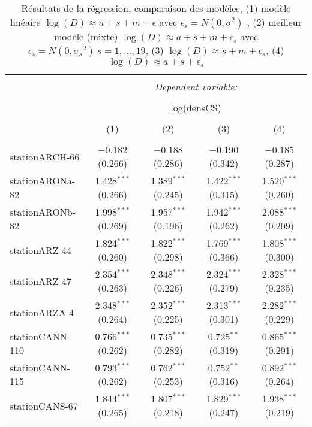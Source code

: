 
\begin{table}[!htbp] \centering 
  \caption{Résultats de la régression,
				comparaison des modèles, (1) modèle linéaire $\log (D){\approx}a+s+m+\epsilon$ avec $\epsilon_s=N(0,{\sigma}^2) $
				, (2) meilleur modèle (mixte) $\log (D){\approx}a+s+m+\epsilon_s$ avec $\epsilon_s=N(0,{\sigma_{s}}^2) ~s=1,\dots,19$,
				(3) $\log (D){\approx}s+m+\epsilon_s$,
				(4) $\log (D){\approx}a+s+\epsilon_s$} 
  \label{annex_regression_result} 
\begin{tabular}{@{\extracolsep{5pt}}lcccc} 
\\[-1.8ex]\hline 
\hline \\[-1.8ex] 
 & \multicolumn{4}{c}{\textit{Dependent variable:}} \\ 
\cline{2-5} 
\\[-1.8ex] & \multicolumn{4}{c}{log(densCS)} \\ 
\\[-1.8ex] & (1) & (2) & (3) & (4)\\ 
\hline \\[-1.8ex] 
 stationARCH-66 & $-$0.182 (0.266) & $-$0.188 (0.286) & $-$0.190 (0.342) & $-$0.185 (0.287) \\ 
  stationARONa-82 & 1.428$^{***}$ (0.266) & 1.389$^{***}$ (0.245) & 1.422$^{***}$ (0.315) & 1.520$^{***}$ (0.260) \\ 
  stationARONb-82 & 1.998$^{***}$ (0.269) & 1.957$^{***}$ (0.196) & 1.942$^{***}$ (0.262) & 2.088$^{***}$ (0.209) \\ 
  stationARZ-44 & 1.824$^{***}$ (0.260) & 1.822$^{***}$ (0.298) & 1.769$^{***}$ (0.366) & 1.808$^{***}$ (0.300) \\ 
  stationARZ-47 & 2.354$^{***}$ (0.263) & 2.348$^{***}$ (0.226) & 2.324$^{***}$ (0.279) & 2.328$^{***}$ (0.235) \\ 
  stationARZA-4 & 2.348$^{***}$ (0.264) & 2.352$^{***}$ (0.225) & 2.313$^{***}$ (0.301) & 2.282$^{***}$ (0.229) \\ 
  stationCANN-110 & 0.766$^{***}$ (0.262) & 0.735$^{***}$ (0.282) & 0.725$^{**}$ (0.319) & 0.865$^{***}$ (0.291) \\ 
  stationCANN-115 & 0.793$^{***}$ (0.262) & 0.762$^{***}$ (0.253) & 0.752$^{**}$ (0.316) & 0.892$^{***}$ (0.264) \\ 
  stationCANS-67 & 1.844$^{***}$ (0.265) & 1.807$^{***}$ (0.218) & 1.829$^{***}$ (0.247) & 1.938$^{***}$ (0.219) \\ 

\end{tabular}
\end{table}
